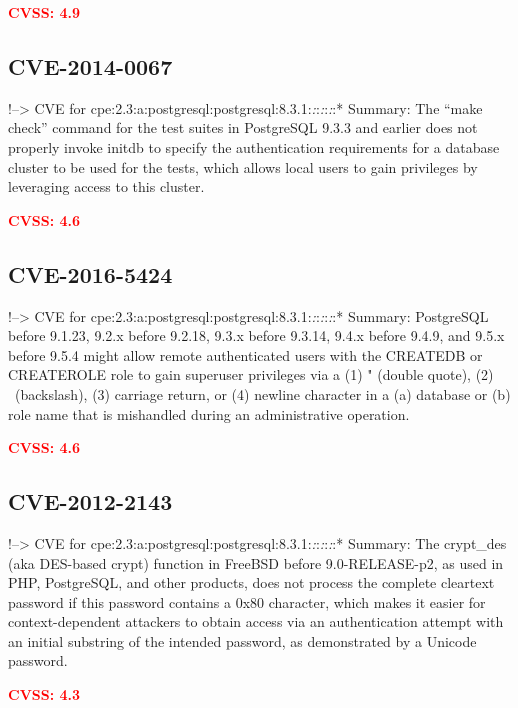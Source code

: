 \documentclass[a4paper, 12pt]{article}
\begin{document}
\textbf{\textcolor{red}{CVSS: 4.9}}

\hypertarget{cve-2014-0067}{%
\subsection{CVE-2014-0067}\label{cve-2014-0067}}

!--\textgreater{} CVE for
cpe:2.3:a:postgresql:postgresql:8.3.1:\emph{:}:\emph{:}:\emph{:}:*
Summary: The ``make check'' command for the test suites in PostgreSQL
9.3.3 and earlier does not properly invoke initdb to specify the
authentication requirements for a database cluster to be used for the
tests, which allows local users to gain privileges by leveraging access
to this cluster.

\textbf{\textcolor{red}{CVSS: 4.6}}

\hypertarget{cve-2016-5424}{%
\subsection{CVE-2016-5424}\label{cve-2016-5424}}

!--\textgreater{} CVE for
cpe:2.3:a:postgresql:postgresql:8.3.1:\emph{:}:\emph{:}:\emph{:}:*
Summary: PostgreSQL before 9.1.23, 9.2.x before 9.2.18, 9.3.x before
9.3.14, 9.4.x before 9.4.9, and 9.5.x before 9.5.4 might allow remote
authenticated users with the CREATEDB or CREATEROLE role to gain
superuser privileges via a (1) " (double quote), (2) ~(backslash), (3)
carriage return, or (4) newline character in a (a) database or (b) role
name that is mishandled during an administrative operation.

\textbf{\textcolor{red}{CVSS: 4.6}}

\hypertarget{cve-2012-2143}{%
\subsection{CVE-2012-2143}\label{cve-2012-2143}}

!--\textgreater{} CVE for
cpe:2.3:a:postgresql:postgresql:8.3.1:\emph{:}:\emph{:}:\emph{:}:*
Summary: The crypt\_des (aka DES-based crypt) function in FreeBSD before
9.0-RELEASE-p2, as used in PHP, PostgreSQL, and other products, does not
process the complete cleartext password if this password contains a 0x80
character, which makes it easier for context-dependent attackers to
obtain access via an authentication attempt with an initial substring of
the intended password, as demonstrated by a Unicode password.

\textbf{\textcolor{red}{CVSS: 4.3}}
\end{document}
